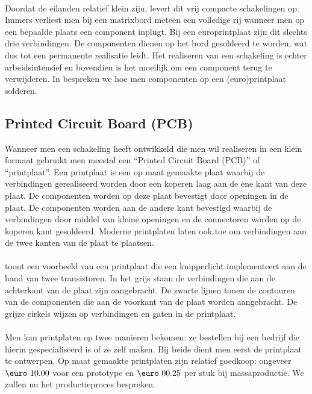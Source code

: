 \paragraph{}
Doordat de eilanden relatief klein zijn, levert dit vrij compacte schakelingen op. Immers verliest men bij een matrixbord meteen een volledige rij wanneer men op een bepaalde plaats een component inplugt. Bij een europrintplaat zijn dit slechts drie verbindingen. De componenten dienen op het bord gesoldeerd te worden, wat dus tot een permanente realisatie leidt. Het realiseren van een schakeling is echter arbeidsintensief en bovendien is het moeilijk om een component terug te verwijderen. In  bespreken we hoe men componenten op een (euro)printplaat solderen.
\subsection{Printed Circuit Board (PCB)}
Wanneer men een schakeling heeft ontwikkeld die men wil realiseren in een klein formaat gebruikt men meestal een ``Printed Circuit Board (PCB)'' of ``printplaat''. Een printplaat is een op maat gemaakte plaat waarbij de verbindingen gerealiseerd worden door een koperen laag aan de ene kant van deze plaat. De componenten worden op deze plaat bevestigt door openingen in de plaat. De componenten worden aan de andere kant bevestigd waarbij de verbindingen door middel van kleine openingen en de connectoren worden op de koperen kant gesoldeerd. Moderne printplaten laten ook toe om verbindingen aan de twee kanten van de plaat te plaatsen.
\paragraph{}
 toont een voorbeeld van een printplaat die een knipperlicht implementeert aan de hand van twee transistoren. In het grijs staan de verbindingen die aan de achterkant van de plaat zijn aangebracht. De zwarte lijnen tonen de contouren van de componenten die aan de voorkant van de plaat worden aangebracht. De grijze cirkels wijzen op verbindingen en gaten in de printplaat.
\paragraph{}
Men kan printplaten op twee manieren bekomen: ze bestellen bij een bedrijf die hierin gespecialiseerd is of ze zelf maken. Bij beide dient men eerst de printplaat te ontwerpen. Op maat gemaakte printplaten zijn relatief goedkoop: ongeveer $\mbox{\euro}\ 10.00$ voor een prototype en $\mbox{\euro}\ 00.25$ per stuk bij massaproductie. We zullen nu het productieproces bespreken.
